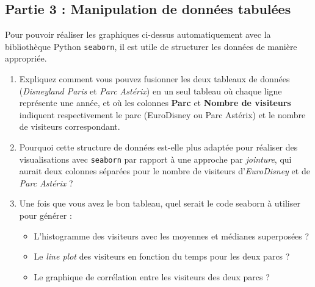 \documentclass[a4paper,11pt]{article}
\begin{document}
\subsection*{Partie 3 : Manipulation de données tabulées}
Pour pouvoir réaliser les graphiques ci-dessus automatiquement avec la bibliothèque Python \texttt{seaborn}, il est utile de structurer les données de manière appropriée.

\begin{enumerate}
    \item Expliquez comment vous pouvez fusionner les deux tableaux de données (\textit{Disneyland Paris} et \textit{Parc Astérix}) en un seul tableau où chaque ligne représente une année, et où les colonnes \textbf{Parc} et \textbf{Nombre de visiteurs} indiquent respectivement le parc (EuroDisney ou Parc Astérix) et le nombre de visiteurs correspondant.
    \item Pourquoi cette structure de données est-elle plus adaptée pour réaliser des visualisations avec \texttt{seaborn} par rapport à une approche par \textit{jointure}, qui aurait deux colonnes séparées pour le nombre de visiteurs d'\textit{EuroDisney} et de \textit{Parc Astérix} ?  
    \item Une fois que vous avez le bon tableau, quel serait le code seaborn à utiliser pour générer :
    \begin{itemize}
        \item L'histogramme des visiteurs avec les moyennes et médianes superposées ?
        \item Le \textit{line plot} des visiteurs en fonction du temps pour les deux parcs ?
        \item Le graphique de corrélation entre les visiteurs des deux parcs ?
    \end{itemize}
\end{enumerate}


\end{document}
